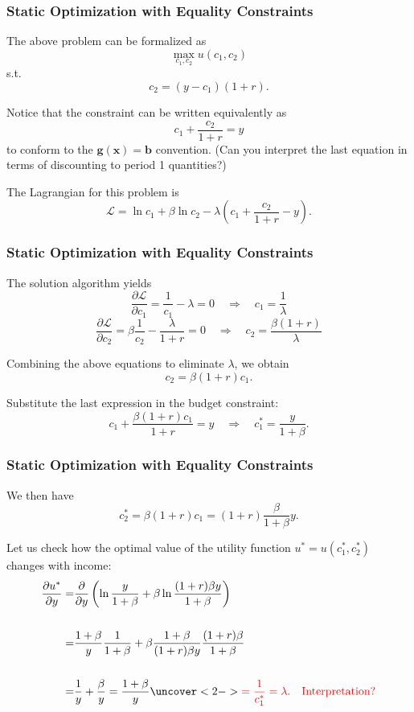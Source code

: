 \documentclass[10pt]{beamer}
\theoremstyle{definition}
\begin{document}
\begin{frame}[fragile]
\frametitle{Static Optimization with Equality Constraints}
\addtocounter{theorem}{-1}
\begin{example}[cont.]
The above problem can be formalized as \[  \max_{c_1,c_2} u(c_1,c_2) \]
s.t. \[ c_2 = (y-c_1)(1+r). \]

Notice that the constraint can be written equivalently as \[ c_1 + \dfrac{c_2}{1+r} = y \] to conform to the $ \mathbf{g}(\mathbf{x})=\mathbf{b} $ convention. (Can you interpret the last equation in terms of discounting to period 1 quantities?)

The Lagrangian for this problem is \[ \mathcal{L} = \ln c_1 + \beta \ln c_2 - \lambda \left(  c_1 + \frac{c_2}{1+r} - y \right). \]
\end{example}
\end{frame}

\begin{frame}[fragile]
\frametitle{Static Optimization with Equality Constraints}
\addtocounter{theorem}{-1}
\begin{example}[cont.] The solution algorithm yields
\[ \dfrac{\partial \mathcal{L}}{\partial c_1} = \dfrac{1}{c_1} - \lambda = 0 \quad \Rightarrow \quad c_1 = \dfrac{1}{\lambda} \]
\[ \dfrac{\partial \mathcal{L}}{\partial c_2} = \beta \dfrac{1}{c_2} - \dfrac{\lambda}{1+r} = 0 \quad \Rightarrow \quad c_2 = \dfrac{\beta (1+r)}{\lambda} \]

Combining the above equations to eliminate $ \lambda $, we obtain \[ c_2 = \beta (1+r)c_1. \]

Substitute the last expression in the budget constraint:
\[ c_1 + \dfrac{\beta (1+r)c_1}{1+r} = y \quad \Rightarrow \quad c_1^* = \dfrac{y}{1+\beta}.\]
\end{example}
\end{frame}

\begin{frame}[fragile]
\frametitle{Static Optimization with Equality Constraints}
\addtocounter{theorem}{-1}
\begin{example}[cont.] 
We then have \[ c_2^* = \beta (1+r)c_1 =  (1+r)\dfrac{\beta}{1+\beta}y. \]

Let us check how the optimal value of the utility function $u^*= u(c_1^*,c_2^*) $ changes with income: 
\[ \begin{split}
\dfrac{\partial u^*}{\partial y} = & \dfrac{\partial }{\partial y} \left( \ln \dfrac{y}{1+\beta} + \beta \ln  \dfrac{(1+r)\beta y}{1+\beta} \right)\\ {}\\
= & \dfrac{1+\beta}{y}\dfrac{1}{1+\beta} + \beta \dfrac{1+\beta}{(1+r)\beta y} \dfrac{(1+r)\beta }{1+\beta} \\{}\\
= & \dfrac{1}{y}+\dfrac{\beta}{y} = \dfrac{1+\beta}{y}  \uncover<2->{\color{red}{= \dfrac{1}{c_1^*} = \lambda. \quad \text{Interpretation?}}}
\end{split}\] 
\end{example}
\end{frame}
\end{document}
